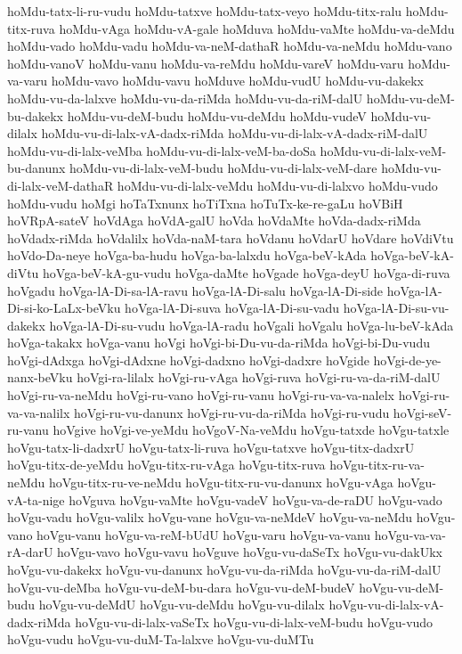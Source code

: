 {hoMdu-tatx-li-ru-vudu
hoMdu-tatxve
hoMdu-tatx-veyo
hoMdu-titx-ralu
hoMdu-titx-ruva
hoMdu-vAga
hoMdu-vA-gale
hoMduva
hoMdu-vaMte
hoMdu-va-deMdu
hoMdu-vado
hoMdu-vadu
hoMdu-va-neM-dathaR
hoMdu-va-neMdu
hoMdu-vano
hoMdu-vanoV
hoMdu-vanu
hoMdu-va-reMdu
hoMdu-vareV
hoMdu-varu
hoMdu-va-varu
hoMdu-vavo
hoMdu-vavu
hoMduve
hoMdu-vudU
hoMdu-vu-dakekx
hoMdu-vu-da-lalxve
hoMdu-vu-da-riMda
hoMdu-vu-da-riM-dalU
hoMdu-vu-deM-bu-dakekx
hoMdu-vu-deM-budu
hoMdu-vu-deMdu
hoMdu-vudeV
hoMdu-vu-dilalx
hoMdu-vu-di-lalx-vA-dadx-riMda
hoMdu-vu-di-lalx-vA-dadx-riM-dalU
hoMdu-vu-di-lalx-veMba
hoMdu-vu-di-lalx-veM-ba-doSa
hoMdu-vu-di-lalx-veM-bu-danunx
hoMdu-vu-di-lalx-veM-budu
hoMdu-vu-di-lalx-veM-dare
hoMdu-vu-di-lalx-veM-dathaR
hoMdu-vu-di-lalx-veMdu
hoMdu-vu-di-lalxvo
hoMdu-vudo
hoMdu-vudu
hoMgi
hoTaTxnunx
hoTiTxna
hoTuTx-ke-re-gaLu
hoVBiH
hoVRpA-sateV
hoVdAga
hoVdA-galU
hoVda
hoVdaMte
hoVda-dadx-riMda
hoVdadx-riMda
hoVdalilx
hoVda-naM-tara
hoVdanu
hoVdarU
hoVdare
hoVdiVtu
hoVdo-Da-neye
hoVga-ba-hudu
hoVga-ba-lalxdu
hoVga-beV-kAda
hoVga-beV-kA-diVtu
hoVga-beV-kA-gu-vudu
hoVga-daMte
hoVgade
hoVga-deyU
hoVga-di-ruva
hoVgadu
hoVga-lA-Di-sa-lA-ravu
hoVga-lA-Di-salu
hoVga-lA-Di-side
hoVga-lA-Di-si-ko-LaLx-beVku
hoVga-lA-Di-suva
hoVga-lA-Di-su-vadu
hoVga-lA-Di-su-vu-dakekx
hoVga-lA-Di-su-vudu
hoVga-lA-radu
hoVgali
hoVgalu
hoVga-lu-beV-kAda
hoVga-takakx
hoVga-vanu
hoVgi
hoVgi-bi-Du-vu-da-riMda
hoVgi-bi-Du-vudu
hoVgi-dAdxga
hoVgi-dAdxne
hoVgi-dadxno
hoVgi-dadxre
hoVgide
hoVgi-de-ye-nanx-beVku
hoVgi-ra-lilalx
hoVgi-ru-vAga
hoVgi-ruva
hoVgi-ru-va-da-riM-dalU
hoVgi-ru-va-neMdu
hoVgi-ru-vano
hoVgi-ru-vanu
hoVgi-ru-va-va-nalelx
hoVgi-ru-va-va-nalilx
hoVgi-ru-vu-danunx
hoVgi-ru-vu-da-riMda
hoVgi-ru-vudu
hoVgi-seV-ru-vanu
hoVgive
hoVgi-ve-yeMdu
hoVgoV-Na-veMdu
hoVgu-tatxde
hoVgu-tatxle
hoVgu-tatx-li-dadxrU
hoVgu-tatx-li-ruva
hoVgu-tatxve
hoVgu-titx-dadxrU
hoVgu-titx-de-yeMdu
hoVgu-titx-ru-vAga
hoVgu-titx-ruva
hoVgu-titx-ru-va-neMdu
hoVgu-titx-ru-ve-neMdu
hoVgu-titx-ru-vu-danunx
hoVgu-vAga
hoVgu-vA-ta-nige
hoVguva
hoVgu-vaMte
hoVgu-vadeV
hoVgu-va-de-raDU
hoVgu-vado
hoVgu-vadu
hoVgu-valilx
hoVgu-vane
hoVgu-va-neMdeV
hoVgu-va-neMdu
hoVgu-vano
hoVgu-vanu
hoVgu-va-reM-bUdU
hoVgu-varu
hoVgu-va-vanu
hoVgu-va-va-rA-darU
hoVgu-vavo
hoVgu-vavu
hoVguve
hoVgu-vu-daSeTx
hoVgu-vu-dakUkx
hoVgu-vu-dakekx
hoVgu-vu-danunx
hoVgu-vu-da-riMda
hoVgu-vu-da-riM-dalU
hoVgu-vu-deMba
hoVgu-vu-deM-bu-dara
hoVgu-vu-deM-budeV
hoVgu-vu-deM-budu
hoVgu-vu-deMdU
hoVgu-vu-deMdu
hoVgu-vu-dilalx
hoVgu-vu-di-lalx-vA-dadx-riMda
hoVgu-vu-di-lalx-vaSeTx
hoVgu-vu-di-lalx-veM-budu
hoVgu-vudo
hoVgu-vudu
hoVgu-vu-duM-Ta-lalxve
hoVgu-vu-duMTu
}
